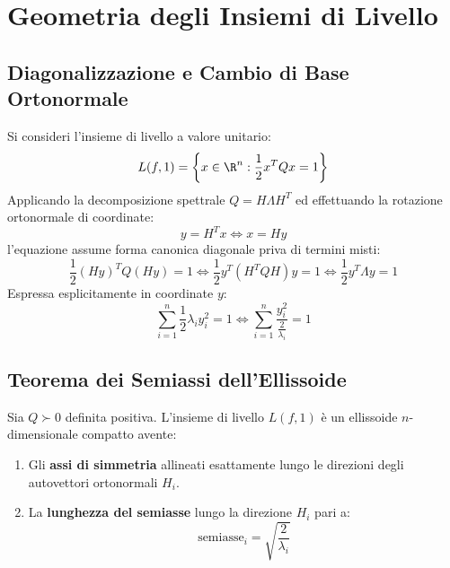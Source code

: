\FloatBarrier
\section{Geometria degli Insiemi di Livello}
\label{sec:opt-geometria-insiemi-livello}

\subsection{Diagonalizzazione e Cambio di Base Ortonormale}
Si consideri l'insieme di livello a valore unitario:
\begin{equation}
L(f, 1) = \left\{x \in \R^n : \frac{1}{2} x^T Q x = 1\right\}
\end{equation}
Applicando la decomposizione spettrale $Q = H \Lambda H^T$ ed effettuando la rotazione ortonormale di coordinate:
\begin{equation}
y = H^T x \iff x = H y
\end{equation}
l'equazione assume forma canonica diagonale priva di termini misti:
\begin{equation}
\frac{1}{2} (H y)^T Q (H y) = 1 \iff \frac{1}{2} y^T (H^T Q H) y = 1 \iff \frac{1}{2} y^T \Lambda y = 1
\end{equation}
Espressa esplicitamente in coordinate $y$:
\begin{equation}
\sum_{i=1}^n \frac{1}{2} \lambda_i y_i^2 = 1 \iff \sum_{i=1}^n \frac{y_i^2}{\frac{2}{\lambda_i}} = 1
\end{equation}

\subsection{Teorema dei Semiassi dell'Ellissoide}
\begin{theorem}
Sia $Q \succ 0$ definita positiva. L'insieme di livello $L(f, 1)$ \`e un ellissoide $n$-dimensionale compatto avente:
\begin{enumerate}
    \item Gli \textbf{assi di simmetria} allineati esattamente lungo le direzioni degli autovettori ortonormali $H_i$.
    \item La \textbf{lunghezza del semiasse} lungo la direzione $H_i$ pari a:
    \begin{equation}
    \text{semiasse}_i = \sqrt{\frac{2}{\lambda_i}}
    \end{equation}
\end{enumerate}
\end{theorem}

